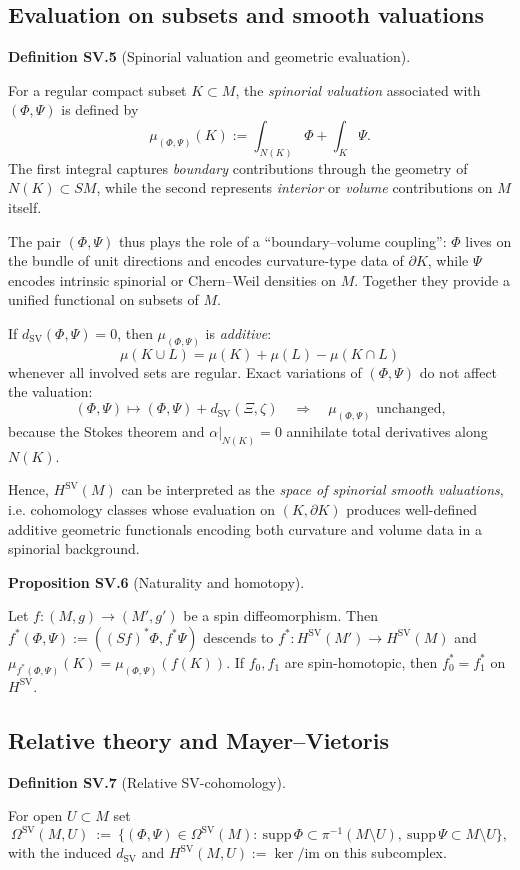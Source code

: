 \documentclass[10pt, letterpaper]{article}
\newcommand{\CustomHeading}[3]{%
  \par\medskip\noindent%
  \textbf{#1 #2} \textnormal{(#3)}.\enskip%
}
\newenvironment{DEF}[2]{\begin{unitbox}\CustomHeading{Definition}{#1}{#2}}{\end{unitbox}}
\newenvironment{PROP}[2]{\begin{unitbox}\CustomHeading{Proposition}{#1}{#2}}{\end{unitbox}}
\begin{document}
\subsection{Evaluation on subsets and smooth valuations}
\begin{DEF}{SV.5}{Spinorial valuation and geometric evaluation}
For a regular compact subset $K\subset M$, the \emph{spinorial valuation} associated with $(\Phi,\Psi)$ is defined by
\[
\mu_{(\Phi,\Psi)}(K):=\int_{N(K)}\Phi+\int_K\Psi.
\]
The first integral captures \emph{boundary} contributions through the geometry of $N(K)\subset SM$, while the second represents \emph{interior} or \emph{volume} contributions on $M$ itself.

The pair $(\Phi,\Psi)$ thus plays the role of a ``boundary–volume coupling'': $\Phi$ lives on the bundle of unit directions and encodes curvature-type data of $\partial K$, while $\Psi$ encodes intrinsic spinorial or Chern–Weil densities on $M$. Together they provide a unified functional on subsets of $M$.

If $d_{\operatorname{SV}}(\Phi,\Psi)=0$, then $\mu_{(\Phi,\Psi)}$ is \emph{additive}:
\[
\mu(K\cup L)=\mu(K)+\mu(L)-\mu(K\cap L)
\]
whenever all involved sets are regular. Exact variations of $(\Phi,\Psi)$ do not affect the valuation:
\[
(\Phi,\Psi)\mapsto(\Phi,\Psi)+d_{\operatorname{SV}}(\Xi,\zeta)
\quad\Rightarrow\quad
\mu_{(\Phi,\Psi)}\text{ unchanged,}
\]
because the Stokes theorem and $\alpha|_{N(K)}=0$ annihilate total derivatives along $N(K)$.

\medskip
Hence, $H^{\operatorname{SV}}(M)$ can be interpreted as the \emph{space of spinorial smooth valuations}, i.e. cohomology classes whose evaluation on $(K,\partial K)$ produces well-defined additive geometric functionals encoding both curvature and volume data in a spinorial background.
\end{DEF}


\begin{PROP}{SV.6}{Naturality and homotopy}
Let $f:(M,g)\to (M',g')$ be a spin diffeomorphism. Then
$f^*(\Phi,\Psi):=((Sf)^*\Phi,f^*\Psi)$ descends to $f^*:H^{\operatorname{SV}}(M')\to H^{\operatorname{SV}}(M)$ and
$\mu_{f^*(\Phi,\Psi)}(K)=\mu_{(\Phi,\Psi)}(f(K))$.
If $f_0,f_1$ are spin-homotopic, then $f_0^*=f_1^*$ on $H^{\operatorname{SV}}$.
\end{PROP}

\subsection{Relative theory and Mayer--Vietoris}
\begin{DEF}{SV.7}{Relative SV-cohomology}
For open $U\subset M$ set
\[
\Omega^{\operatorname{SV}}(M,U)\ :=\ \{(\Phi,\Psi)\in \Omega^{\operatorname{SV}}(M):\ \mathrm{supp}\,\Phi\subset \pi^{-1}(M\!\setminus\!U),\ \mathrm{supp}\,\Psi\subset M\!\setminus\!U\},
\]
with the induced $d_{\operatorname{SV}}$ and $H^{\operatorname{SV}}(M,U):=\ker/\mathrm{im}$ on this subcomplex.
\end{DEF}
\end{document}
